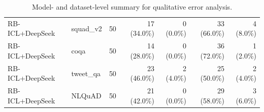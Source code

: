 \begin{table}[htbp]
\begin{tabular}{llrrrrr}
RB-ICL+DeepSeek & squad\_v2 & 50 & 17 (34.0\%) & 0 (0.0\%) & 33 (66.0\%) & 4 (8.0\%) \\
RB-ICL+DeepSeek & coqa & 50 & 14 (28.0\%) & 0 (0.0\%) & 36 (72.0\%) & 1 (2.0\%) \\
RB-ICL+DeepSeek & tweet\_qa & 50 & 23 (46.0\%) & 2 (4.0\%) & 25 (50.0\%) & 2 (4.0\%) \\
RB-ICL+DeepSeek & NLQuAD & 50 & 21 (42.0\%) & 0 (0.0\%) & 29 (58.0\%) & 3 (6.0\%) \\
\bottomrule
\end{tabular}
\caption{Model- and dataset-level summary for qualitative error analysis.}
\label{tab:model_dataset_summary}
\end{table}

